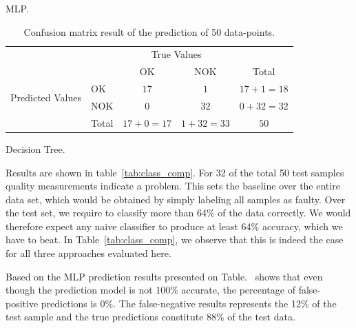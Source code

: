 \documentclass[5p,times,procedia]{elsarticle}
\begin{document}
\begin{table}
\begin{subtable}[h]{0.3\textwidth}
              \caption{MLP.}
              \label{tab:MPL_conf_matrix}
       \end{subtable}
       \begin{subtable}[h]{0.3\textwidth}
              \centering
              \begin{adjustbox}{width=1.6\textwidth}
              \begin{tabular}{l|l|c|c|c}
                     \multicolumn{2}{c}{}&\multicolumn{2}{c}{True Values}&\\
                     \cline{3-4}
                     \multicolumn{2}{c|}{}& OK & NOK &\multicolumn{1}{c}{Total}\\
                     \cline{2-4}
                     \multirow{2}{*}{Predicted Values}& OK & $17$ & $1$ & $17+1 = 18$\\
                     \cline{2-4}
                     & NOK & $0$ & $32$ & $0+32 = 32$\\
                     \cline{2-4}
                     \multicolumn{1}{c}{} & \multicolumn{1}{c}{Total} & \multicolumn{1}{c}{$17+0 = 17$} & \multicolumn{    1}{c}{$1+32 = 33$} & \multicolumn{1}{c}{$50$}\\
              \end{tabular}
              \end{adjustbox}
              \caption{Decision Tree.}
              \label{tab:Tree_conf_matrix}
       \end{subtable}
       \caption{Confusion matrix result of the prediction of 50 data-points.}
       \label{tab:Confusion_matrix}
\end{table}


Results are shown in table~\ref{tab:class_comp}. For 32 of the total 50 test samples
quality measurements indicate a problem. This sets the 
baseline over the entire data set, which would be obtained by simply labeling all samples
as faulty. Over the test set, we require to classify more than 64\% of the data correctly.
We would therefore expect any naive classifier to produce at least 64\% accuracy, which we have to beat. In Table~\ref{tab:class_comp}, we observe that this is indeed the case for all three approaches evaluated here.

Based on the MLP prediction results presented on Table.~ shows that even though the prediction model is not 100\% accurate, the percentage of false-positive predictions is 0\%. The false-negative results represents the 12\% of the test sample and the true predictions constitute 88\% of the test data.
\end{document}
